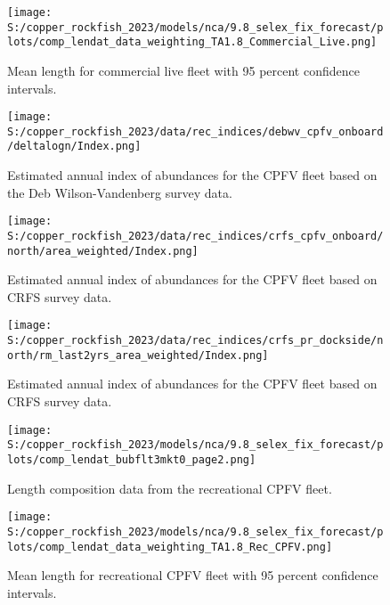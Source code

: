\documentclass[11pt,
  english,
  letterpaper,
]{article}
\begin{document}
\pagebreak

\begin{figure}
\centering
\texttt{[image: S:/copper\_rockfish\_2023/models/nca/9.8\_selex\_fix\_forecast/plots/comp\_lendat\_data\_weighting\_TA1.8\_Commercial\_Live.png]}
\caption{Mean length for commercial live fleet with 95 percent confidence intervals.\label{fig:mean-com-live-len-data}}
\end{figure}

\pagebreak

\pagebreak

\begin{figure}
\centering
\texttt{[image: S:/copper\_rockfish\_2023/data/rec\_indices/debwv\_cpfv\_onboard/deltalogn/Index.png]}
\caption{Estimated annual index of abundances for the CPFV fleet based on the Deb Wilson-Vandenberg survey data.\label{fig:dwv-index-main}}
\end{figure}

\pagebreak

\begin{figure}
\centering
\texttt{[image: S:/copper\_rockfish\_2023/data/rec\_indices/crfs\_cpfv\_onboard/north/area\_weighted/Index.png]}
\caption{Estimated annual index of abundances for the CPFV fleet based on CRFS survey data.\label{fig:crfs-index-main}}
\end{figure}

\pagebreak

\begin{figure}
\centering
\texttt{[image: S:/copper\_rockfish\_2023/data/rec\_indices/crfs\_pr\_dockside/north/rm\_last2yrs\_area\_weighted/Index.png]}
\caption{Estimated annual index of abundances for the CPFV fleet based on CRFS survey data.\label{fig:crfs-pr-index-main}}
\end{figure}

\pagebreak

\begin{figure}
\centering
\texttt{[image: S:/copper\_rockfish\_2023/models/nca/9.8\_selex\_fix\_forecast/plots/comp\_lendat\_bubflt3mkt0\_page2.png]}
\caption{Length composition data from the recreational CPFV fleet.\label{fig:rec-cpfv-len-data}}
\end{figure}

\pagebreak

\begin{figure}
\centering
\texttt{[image: S:/copper\_rockfish\_2023/models/nca/9.8\_selex\_fix\_forecast/plots/comp\_lendat\_data\_weighting\_TA1.8\_Rec\_CPFV.png]}
\caption{Mean length for recreational CPFV fleet with 95 percent confidence intervals.\label{fig:mean-rec-cpfv-len-data}}
\end{figure}
\end{document}
